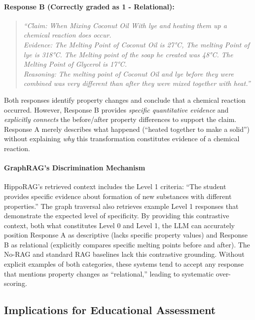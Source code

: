 \documentclass{edm_article}
\begin{document}
\paragraph{Response B (Correctly graded as 1 - Relational):}
\begin{quote}
\vspace{-12pt}
\textit{``Claim: When Mixing Coconut Oil With lye and heating them up a chemical reaction does occur.}\\
\textit{Evidence: The Melting Point of Coconut Oil is 27°C, The melting Point of lye is 318°C. The Melting point of the soap he created was 48°C. The Melting Point of Glycerol is 17°C.}\\
\textit{Reasoning: The melting point of Coconut Oil and lye before they were combined was very different than after they were mixed together with heat.''}
\end{quote}
\vspace{-12pt}
Both responses identify property changes and conclude that a chemical reaction occurred. However, Response B provides \textit{specific quantitative evidence} and \textit{explicitly connects} the before/after property differences to support the claim. Response A merely describes what happened (``heated together to make a solid'') without explaining \textit{why} this transformation constitutes evidence of a chemical reaction.

\paragraph{GraphRAG's Discrimination Mechanism}
HippoRAG's retrieved context includes the Level 1 criteria: ``The student provides specific evidence about formation of new substances with different properties.'' The graph traversal also retrieves example Level 1 responses that demonstrate the expected level of specificity. By providing this contrastive context, both what constitutes Level 0 and Level 1, the LLM can accurately position Response A as descriptive (lacks specific property values) and Response B as relational (explicitly compares specific melting points before and after).
The No-RAG and standard RAG baselines lack this contrastive grounding. Without explicit examples of both categories, these systems tend to accept any response that mentions property changes as ``relational,'' leading to systematic over-scoring.

\subsection{Implications for Educational Assessment}
\end{document}
